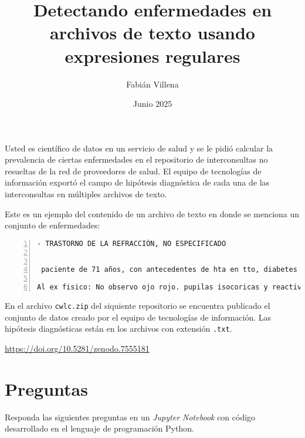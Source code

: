 \documentclass{article}
\title{Detectando enfermedades en archivos de texto usando expresiones regulares}
\author{Fabián Villena}
\date{Junio 2025}
\begin{document}
\maketitle

Usted es científico de datos en un servicio de salud y se le pidió calcular la prevalencia de ciertas enfermedades en el repositorio de interconsultas no resueltas de la red de proveedores de salud. El equipo de tecnologías de información exportó el campo de hipótesis diagnóstica de cada una de las interconsultas en múltiples archivos de texto.

Este es un ejemplo del contenido de un archivo de texto en donde se menciona un conjunto de enfermedades:

\begin{lstlisting}[breaklines=true, extendedchars=true,numbers=left,frame=single]
- TRASTORNO DE LA REFRACCIÓN, NO ESPECIFICADO


 paciente de 71 años, con antecedentes de hta en tto, diabetes insulinodependiente, dislipidemia, hipotiroidismo en tto, enfermedad renal cronica etapa iii,tabaquismo cronico importante, en febrero de este año lo suspendio. Refiere que tiene principios de Alzheimer y parkinson?????? NO SALE REGISTRO DE DIAGNOSTICOS. Refiere que necesita ic a oftalmologo. Tiene astigmatismo y miopia, ocupa lentes para ambos trastornos de viciorefraccion, refiere que hace 4 meses que ve borroso utilizando lentes ópticos.  Fue operada hace mas de 2 años por retinopatia diabetica en ambos ojos. 

Al ex fisico: No observo ojo rojo. pupilas isocoricas y reactivas. no observo opacidades corneales. RFM presente. agudeza visual conservada.
\end{lstlisting}

En el archivo \texttt{cwlc.zip} del siquiente repositorio se encuentra publicado el conjunto de datos creado por el equipo de tecnologías de información. Las hipótesis diagnósticas están en los archivos con extensión \texttt{.txt}.

\begin{center}
	\url{https://doi.org/10.5281/zenodo.7555181}
\end{center}

\section*{Preguntas}

Responda las siguientes preguntas en un \textit{Jupyter Notebook} con código desarrollado en el lenguaje de programación Python.
\end{document}
